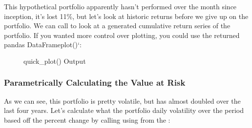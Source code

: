 \documentclass[letterpaper,10pt,english]{sphinxmanual}
\begin{document}
%
\begin{sphinxVerbatim}[commandchars=\\\{\}]
  
\end{sphinxVerbatim}

This hypothetical portfolio apparently hasn’t performed over the month
since inception, it’s lost 11\%, but let’s look at historic returns
before we give up on the portfolio. We can call 
to look at a  generated cumulative return series of the
portfolio. If you wanted more control over plotting, you could use the
returned
pandas
DataFrameplot(){}`:

%
\begin{sphinxVerbatim}[commandchars=\\\{\}]
  
\end{sphinxVerbatim}

\begin{figure}[htbp]
\centering
\capstart

\noindent{}
\caption{quick\_plot() Output}\label{\detokenize{gettingstarted:id1}}\end{figure}


\subsubsection{Parametrically Calculating the Value at Risk}
\label{\detokenize{gettingstarted:parametrically-calculating-the-value-at-risk}}
As we can see, this portfolio is pretty volatile, but has almost doubled
over the last four years. Let’s calculate what the portfolio daily
volatility over the period based off the percent change by calling
 using  from the
:
\end{document}
